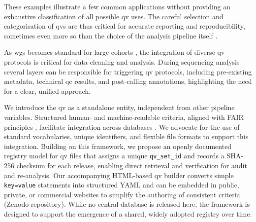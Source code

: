 These examples illustrate a few common applications without providing an exhaustive classification of all possible \ac{qv} uses.
The careful selection and categorisation of \ac{qv}s are thus critical for accurate reporting and reproducibility, sometimes even more so than the choice of the analysis pipeline itself \cite{olson2023variant}.

As \ac{wgs} becomes standard for large cohorts \cite{lee2018gene, jansen2019genome}, the integration of diverse \ac{qv} protocols is critical for data cleaning and analysis. 
During sequencing analysis several layers can be responsible for triggering \ac{qv} protocols, including
pre-existing metadata, technical \ac{qc} results, and post-calling annotations,
highlighting the need for a clear, unified approach. 

We introduce the \ac{qv} as a standalone entity, independent from other pipeline variables. Structured human- and machine-readable criteria, aligned with FAIR principles \cite{wilkinson2016fair}, facilitate integration across databases \cite{van2023bridging, toure2023fairification}. We advocate for the use of standard vocabularies, unique identifiers, and flexible file formats to support this integration.
Building on this framework, we propose an openly documented registry model for \ac{qv} files that assigns a unique \texttt{qv\_set\_id} and records a SHA-256 checksum for each release, enabling direct retrieval and verification for audit and re-analysis. Our accompanying HTML-based \ac{qv} builder converts simple \texttt{key=value} statements into structured YAML and can be embedded in public, private, or commercial websites to simplify the authoring of consistent criteria (Zenodo repository). While no central database is released here, the framework is designed to support the emergence of a shared, widely adopted registry over time.

